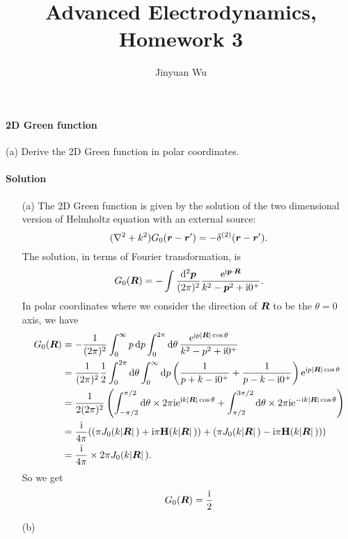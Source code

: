 \documentclass[hyperref, a4paper]{article}
\title{Advanced Electrodynamics, Homework 3}
\author{Jinyuan Wu}
\newcommand*{\ii}{\mathrm{i}}
\newcommand*{\ee}{\mathrm{e}}
\begin{document}
\maketitle

\paragraph{2D Green function} (a) Derive the 2D Green function in polar coordinates.

\paragraph{Solution} \begin{itemize}
\item[(a)] The 2D Green function is given by the solution of the two dimensional version of Helmholtz equation
with an external source: 
\begin{equation}
    (\laplacian + k^2) G_0(\vb*{r} - \vb*{r}') = - \delta^{(2)}(\vb*{r} - \vb*{r}').
\end{equation}  
The solution, in terms of Fourier transformation, is 
\[
    G_0(\vb*{R}) = - \int \frac{\dd[2]{\vb*{p}}}{(2\pi)^2} \frac{\ee^{\ii \vb*{p} \cdot \vb*{R}}}{k^2 - {\vb*{p}}^2 + \ii 0^+}.
\]
In polar coordinates where we consider the direction of $\vb*{R}$ to be the $\theta = 0$ axis, we have 
\[
    \begin{aligned}
        G_0(\vb*{R}) &= - \frac{1}{(2\pi)^2} \int_{0}^\infty p \dd{p} \int_{0}^{2\pi} \dd{\theta} 
        \frac{\ee^{\ii p \abs*{\vb*{R}} \cos \theta}}{k^2 - p^2 + \ii 0^+} \\
        &= \frac{1}{(2\pi)^2} \frac{1}{2} \int_{0}^{2\pi} \dd{\theta} \int_0^\infty \dd{p}
        \left( \frac{1}{p + k - \ii 0^+} + \frac{1}{p - k - \ii 0^+} \right) 
        \ee^{\ii p \abs*{\vb*{R}} \cos \theta} \\
        &= \frac{1}{2 (2\pi)^2} \left(
            \int_{-\pi/2}^{\pi/2} \dd{\theta} \times 2 \pi \ii \ee^{\ii k \abs*{\vb*{R}} \cos \theta}
            + \int_{\pi/2}^{3\pi/2} \dd{\theta} \times 2 \pi \ii \ee^{- \ii k \abs*{\vb*{R}} \cos \theta}
        \right) \\
        &= \frac{\ii}{4\pi} ((\pi J_0(k \abs*{\vb*{R}}) + \ii \pi \mathbf{H}(k \abs*{\vb*{R}}))
        + (\pi J_0(k \abs*{\vb*{R}}) - \ii \pi \mathbf{H}(k \abs*{\vb*{R}}))) \\
        &= \frac{\ii}{4\pi} \times 2 \pi J_0(k \abs*{\vb*{R}}).
    \end{aligned}
\]
So we get 
\begin{equation}
    G_0(\vb*{R}) = \frac{\ii}{2} 
\end{equation}

\item[(b)]
\end{itemize}
\end{document}
